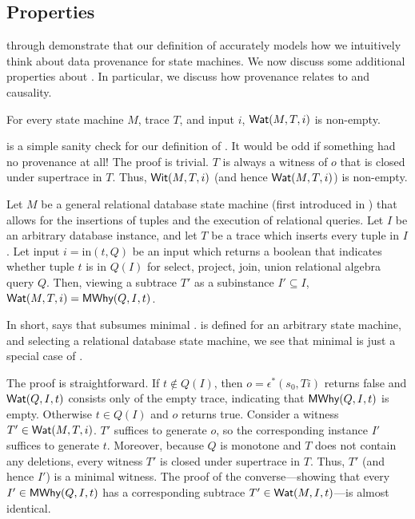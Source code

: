 \subsection{\WatProvenance{} Properties}
 through  demonstrate
that our definition of \watprovenance{} accurately models how we intuitively
think about data provenance for state machines.  We now discuss some additional
properties about \watprovenance{}. In particular, we discuss how
\watprovenance{} provenance relates to \whyprovenance{} and causality.

\begin{theorem}
  For every state machine $M$, trace $T$, and input $i$, $\textsf{Wat}(M, T, i)$ is
  non-empty.
\end{theorem}

 is a simple sanity check for our definition of
\watprovenance{}. It would be odd if something had no provenance at all! The
proof is trivial. $T$ is always a witness of $o$ that is closed under
supertrace in $T$. Thus, $\textsf{Wit}(M, T, i)$ (and hence $\textsf{Wat}(M, T, i)$) is
non-empty.

\newcommand{\Min}{\text{in}}
\begin{theorem}
  Let $M$ be a general relational database state machine (first introduced in
  ) that allows for the insertions of tuples and the
  execution of relational queries. Let $I$ be an arbitrary database instance,
  and let $T$ be a trace which inserts every tuple in $I$. Let input $i =
  \Min(t, Q)$ be an input which returns a boolean that indicates whether tuple
  $t$ is in $Q(I)$ for select, project, join, union relational algebra query
  $Q$. Then, viewing a subtrace $T'$ as a subinstance $I' \subseteq I$,
  $\textsf{Wat}(M, T, i) = \textsf{MWhy}(Q, I, t)$.
\end{theorem}

In short,  says that \watprovenance{} subsumes
minimal \whyprovenance{}. \Watprovenance{} is defined for an arbitrary state
machine, and selecting a relational database state machine, we see that minimal
\whyprovenance{} is just a special case of \watprovenance{}.

The proof is straightforward.
%
If $t \notin Q(I)$, then $o = \epsilon^*(s_0, Ti)$ returns false and $\textsf{Wat}(Q,
I, t)$ consists only of the empty trace, indicating that $\textsf{MWhy}(Q, I, t)$ is
empty.
%
Otherwise $t \in Q(I)$ and $o$ returns true. Consider a witness $T' \in \textsf{Wat}(M,
T, i)$. $T'$ suffices to generate $o$, so the corresponding instance $I'$
suffices to generate $t$. Moreover, because $Q$ is monotone and $T$ does not
contain any deletions, every witness $T'$ is closed under supertrace in $T$.
Thus, $T'$ (and hence $I'$) is a minimal witness. The proof of the
converse---showing that every $I' \in \textsf{MWhy}(Q, I, t)$ has a corresponding
subtrace $T' \in \textsf{Wat}(M, I, t)$---is almost identical.

